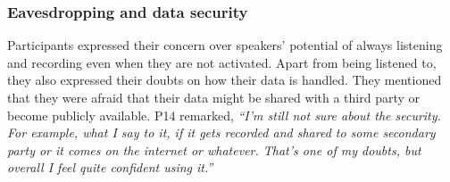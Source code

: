     \subsubsection{Eavesdropping and data security}
    Participants expressed their concern over speakers’ potential of always listening and recording even when they are not activated. 
    Apart from being listened to, they also expressed their doubts on how their data is handled. They mentioned that they were afraid that their data might be shared with a third party or become publicly available. P14 remarked,
            \textit{``I'm still not sure about the security. For example, what I say to it, if it gets recorded and shared to some secondary party or it comes on the internet or whatever. That's one of my doubts, but overall I feel quite confident using it.''}
